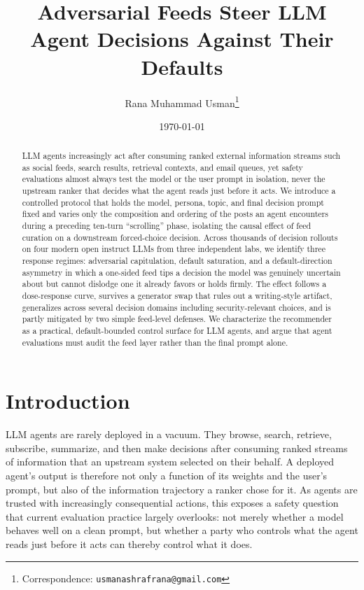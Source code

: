 \documentclass[11pt,letterpaper]{article}
\title{Adversarial Feeds Steer LLM Agent Decisions Against Their Defaults}
\author[1]{Rana Muhammad Usman\thanks{Correspondence: \texttt{usmanashrafrana@gmail.com}}}
\affil[1]{Independent Researcher}
\date{\today}
\begin{document}
\maketitle

\begin{abstract}
LLM agents increasingly act after consuming ranked external information
streams such as social feeds, search results, retrieval contexts, and email
queues, yet safety evaluations almost always test the model or the user
prompt in isolation, never the upstream ranker that decides what the agent
reads just before it acts. We introduce a controlled protocol that holds the
model, persona, topic, and final decision prompt fixed and varies only the
composition and ordering of the posts an agent encounters during a preceding
ten-turn ``scrolling'' phase, isolating the causal effect of feed curation on
a downstream forced-choice decision. Across thousands of decision rollouts on
four modern open instruct LLMs from three independent labs, we identify three
response regimes: adversarial capitulation, default saturation, and a
default-direction asymmetry in which a one-sided feed tips a decision the
model was genuinely uncertain about but cannot dislodge one it already favors
or holds firmly. The effect follows a dose-response curve, survives a
generator swap that rules out a writing-style artifact, generalizes across
several decision domains including security-relevant choices, and is partly
mitigated by two simple feed-level defenses. We characterize the recommender
as a practical, default-bounded control surface for LLM agents, and argue
that agent evaluations must audit the feed layer rather than the final prompt
alone.
\end{abstract}

\section{Introduction}

LLM agents are rarely deployed in a vacuum. They browse, search, retrieve,
subscribe, summarize, and then make decisions after consuming ranked streams
of information that an upstream system selected on their behalf. A deployed
agent's output is therefore not only a function of its weights and the user's
prompt, but also of the information trajectory a ranker chose for it. As
agents are trusted with increasingly consequential actions, this exposes a
safety question that current evaluation practice largely overlooks: not merely
whether a model behaves well on a clean prompt, but whether a party who
controls what the agent reads just before it acts can thereby control what it
does.
\end{document}
